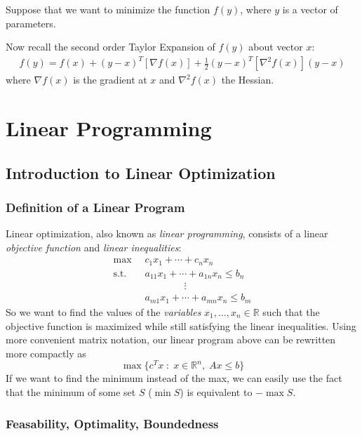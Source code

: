 \documentclass[a4paper,12pt]{scrartcl}
\theoremstyle{definition}
\theoremstyle{remark}
\begin{document}
Suppose that we want to minimize the function $f(y)$, where $y$ is a
vector of parameters.

Now recall the second order Taylor Expansion of $f(y)$ about vector $x$:
\begin{align*}
  f(y) = f(x) + (y-x)^T \left[\nabla f(x)\right]
  + \frac{1}{2} (y-x)^T \left[\nabla^2 f(x)\right](y-x)
\end{align*}
where $\nabla f(x)$ is the gradient at $x$ and $\nabla^2 f(x)$ the
Hessian.



\section{Linear Programming}

\subsection{Introduction to Linear Optimization}

\subsubsection{Definition of a Linear Program}

Linear optimization, also known as \emph{linear programming},
consists of a linear \emph{objective function} and \emph{linear
inequalities}:
\begin{align*}
   \max \; \;& c_1 x_1 + \cdots + c_n x_n \\
   \text{s.t.} \; \;&a_{11} x_1 + \cdots + a_{1n} x_n \leq b_n \\
   & \qquad\qquad \vdots \\
   &a_{m1} x_1 + \cdots + a_{mn} x_n \leq b_m
\end{align*}
So we want to find the values of the \emph{variables}
$x_1, \ldots, x_n \in \mathbb{R}$ such that
the objective function is maximized while still satisfying the
linear inequalities. Using more convenient matrix notation,
our linear program above can be rewritten more compactly as
\begin{equation}
   \label{lp}
   \max \{ c^T x \; : \; x \in \mathbb{R}^n , \; Ax \leq b \}
\end{equation}
If we want to find the minimum instead of the max, we can easily
use the fact that the minimum of some set $S$ ($\min S$) is equivalent
to $-\max S$.

\subsubsection{Feasability, Optimality, Boundedness}
\end{document}
